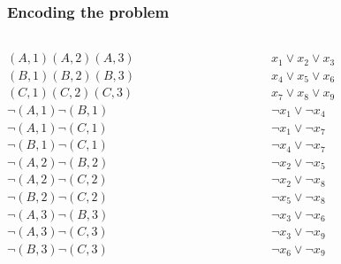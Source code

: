 \documentclass{beamer}
\begin{document}
\begin{frame}[noframenumbering]
\frametitle{Encoding the problem}
\begin{columns}
	\begin{column}{0.1\textwidth}
		\small
		$(A,1) (A,2) (A,3)$\\
		$(B,1) (B,2) (B,3)$\\
		$(C,1) (C,2) (C,3)$\\
		\vspace{1em}
		$ \neg (A,1)  \neg (B,1)$\\
		$ \neg (A,1)  \neg (C,1)$\\
		$ \neg (B,1)  \neg (C,1)$\\
		\vspace{1em}
		$ \neg (A,2)  \neg (B,2)$\\
		$ \neg (A,2)  \neg (C,2)$\\
		$ \neg (B,2)  \neg (C,2)$\\
		\vspace{1em}
		$ \neg (A,3)  \neg (B,3)$\\
		$ \neg (A,3)  \neg (C,3)$\\
		$ \neg (B,3)  \neg (C,3)$\\
	\end{column}
	\begin{column}{0.2\textwidth}  %
		\small
		$ x_1 \lor  x_2 \lor x_3 $ \\
		$x_4 \lor  x_5 \lor x_6 $ \\
		$x_7 \lor  x_8 \lor x_9 $ \\
		\vspace{1em}
		$ \neg x_1 \lor  \neg x_4 $ \\
		$ \neg x_1 \lor  \neg x_7 $ \\
		$ \neg x_4 \lor  \neg x_7 $ \\
		\vspace{1em}
		$\neg x_2 \lor  \neg x_5 $ \\
		$ \neg x_2 \lor  \neg x_8 $ \\
		$ \neg x_5 \lor  \neg x_8 $ \\
		\vspace{1em}
		$ \neg x_3 \lor  \neg x_6 $ \\
		$ \neg x_3 \lor  \neg x_9 $ \\
		$ \neg x_6 \lor  \neg x_9 $ \\
	\end{column}
\end{columns}


\end{frame}
\end{document}
